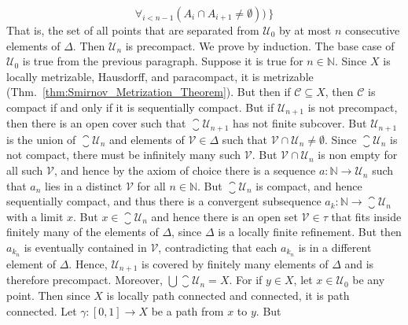 \documentclass{article}                                                        %
\begin{document}
\begin{solution}
\begin{equation}
                        \forall_{i<n-1}(A_{i}\cap{A}_{i+1}\ne\emptyset)
                    \big)\,\Big\}
            \end{equation}
            That is, the set of all points that are separated from
            $\mathcal{U}_{0}$ by at most $n$ consecutive elements of $\Delta$.
            Then $\mathcal{U}_{n}$ is precompact. We prove by induction. The
            base case of $\mathcal{U}_{0}$ is true from the previous paragraph.
            Suppose it is true for $n\in\mathbb{N}$. Since $X$ is locally
            metrizable, Hausdorff, and paracompact, it is metrizable
            (Thm.~\ref{thm:Smirnov_Metrization_Theorem}). But then if
            $\mathcal{C}\subseteq{X}$, then $\mathcal{C}$ is compact if and only
            if it is sequentially compact. But if $\mathcal{U}_{n+1}$ is not
            precompact, then there is an open cover such that
            $\closure{\mathcal{U}_{n+1}}$ has not finite subcover. But
            $\mathcal{U}_{n+1}$ is the union of $\closure{\mathcal{U}_{n}}$ and
            elements of $\mathcal{V}\in\Delta$ such that
            $\mathcal{V}\cap\mathcal{U}_{n}\ne\emptyset$. Since
            $\closure{\mathcal{U}_{n}}$ is not compact, there must be infinitely
            many such $\mathcal{V}$. But $\mathcal{V}\cap\mathcal{U}_{n}$ is non
            empty for all such $\mathcal{V}$, and hence by the axiom of choice
            there is a sequence $a:\mathbb{N}\rightarrow\mathcal{U}_{n}$ such
            that $a_{n}$ lies in a distinct $\mathcal{V}$ for all
            $n\in\mathbb{N}$. But $\closure{\mathcal{U}_{n}}$ is compact, and
            hence sequentially compact, and thus there is a convergent
            subsequence $a_{k}:\mathbb{N}\rightarrow\closure{\mathcal{U}_{n}}$
            with a limit $x$. But $x\in\closure{\mathcal{U}_{n}}$ and hence
            there is an open set $\mathcal{V}\in\tau$ that fits inside finitely
            many of the elements of $\Delta$, since $\Delta$ is a locally finite
            refinement. But then $a_{k_{n}}$ is eventually contained in
            $\mathcal{V}$, contradicting that each $a_{k_{n}}$ is in a different
            element of $\Delta$. Hence, $\mathcal{U}_{n+1}$ is covered by
            finitely many elements of $\Delta$ and is therefore precompact.
            Moreover, $\bigcup\closure{\mathcal{U}_{n}}=X$. For if
            $y\in{X}$, let $x\in\mathcal{U}_{0}$ be any point. Then since
            $X$ is locally path connected and connected, it is path connected.
            Let $\gamma:[0,1]\rightarrow{X}$ be a path from $x$ to $y$. But

\end{solution}
\end{document}
